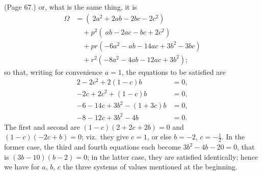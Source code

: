 \documentclass[11pt,a4paper]{article}
\begin{document}
\bigskip

\noindent (Page 67.) or, what is the same thing, it is
\begin{align*}
\Omega &= (\ 2a^2 + 2ab - 2bc - 2c^2) \\
 &\quad + p^2 (\ ab - 2ac - bc + 2c^2) \\
 &\quad + pr (-6a^2 - ab - 14ac + 3b^2 - 3bc) \\
 &\quad + r^2 (-8a^2 - 4ab - 12ac + 3b^2);
\end{align*}
so that, writing for convenience $a = 1$, the equations to be satisfied are
\begin{align*}
2 - 2c^2 + 2(1 - c)b &= 0, \\
-2c + 2c^2 + (1 - c)b &= 0, \\
-6 - 14c + 3b^2 - (1 + 3c)b &= 0, \\
-8 - 12c + 3b^2 - 4b &= 0.
\end{align*}
The first and second are $(1 - c)(2 + 2c + 2b) = 0$ and $(1 - c)(-2c + b) = 0$; viz.\ they give $c = 1$, or else $b = -2$, $c = -\tfrac{1}{2}$. In the former case, the third and fourth equations each become $3b^2 - 4b - 20 = 0$, that is $(3b - 10)(b - 2) = 0$; in the latter case, they are satisfied identically; hence we have for $a$, $b$, $c$ the three systems of values mentioned at the beginning.
\end{document}

